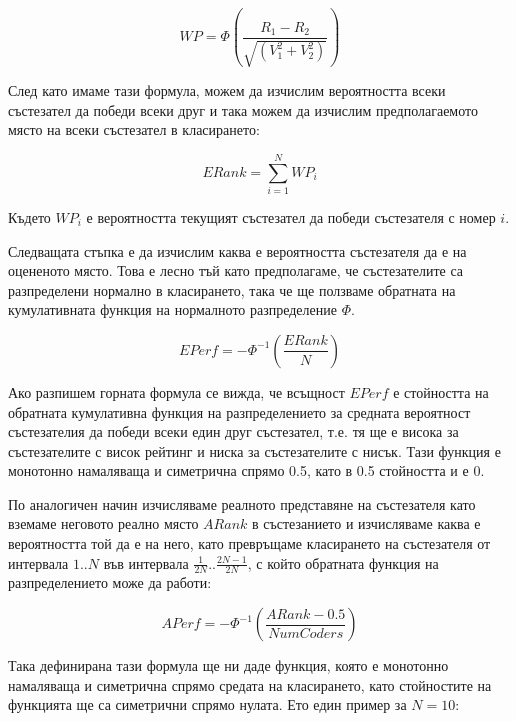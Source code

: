 \documentclass[a4paper,12pt]{article}
\begin{document}
  \begin{equation}
    WP=\Phi\left(\frac{R_1 - R_2}{\sqrt{(V_1^2+V_2^2)}}\right)
  \end{equation}
  
  След като имаме тази формула, можем да изчислим вероятността всеки състезател да победи всеки друг и така можем да изчислим предполагаемото място на всеки състезател в класирането:
  
  \begin{equation}
    ERank=\sum\limits_{i=1}^{N} WP_i
  \end{equation}
  
  Където \(WP_i\) е вероятността текущият състезател да победи състезателя с номер \(i\).
  
  Следващата стъпка е да изчислим каква е вероятността състезателя да е на оцененото място. Това е лесно тъй като предполагаме, че състезателите са разпределени нормално в класирането, така че ще ползваме обратната на кумулативната функция на нормалното разпределение \(\Phi\).
  
  \begin{equation}
    EPerf=-\Phi^{-1}\left(\frac{ERank}{N}\right)
  \end{equation}
  
  Ако разпишем горната формула се вижда, че всъщност \(EPerf\) е стойността на обратната кумулативна функция на разпределението за средната вероятност състезателия да победи всеки един друг състезател, т.е. тя ще е висока за състезателите с висок рейтинг и ниска за състезателите с нисък. Тази функция е монотонно намаляваща и симетрична спрямо 0.5, като в 0.5 стойността и е 0.
  
  По аналогичен начин изчисляваме реалното представяне на състезателя като вземаме неговото реално място \(ARank\) в състезанието и изчисляваме каква е вероятността той да е на него, като превръщаме класирането на състезателя от интервала \(1..N\) във интервала \(\frac{1}{2N}..\frac{2N-1}{2N}\), с който обратната функция на разпределението може да работи:

  \begin{equation}
    APerf=-\Phi^{-1}\left(\frac{ARank - 0.5}{NumCoders}\right)
  \end{equation}
  
  Така дефинирана тази формула ще ни даде функция, която е монотонно намаляваща и симетрична спрямо средата на класирането, като стойностите на функцията ще са симетрични спрямо нулата. Ето един пример за \(N=10\):
  
\end{document}
